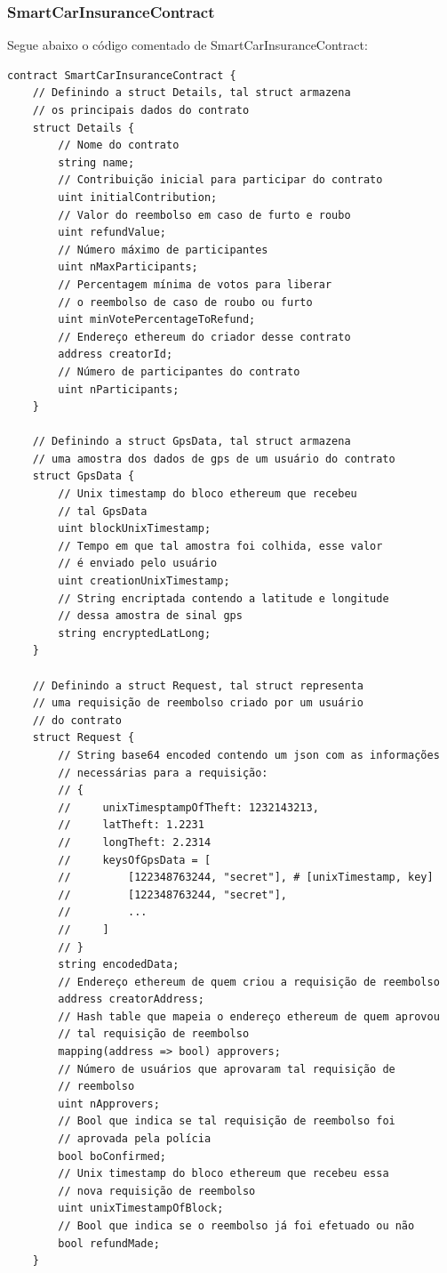 \subsubsection{SmartCarInsuranceContract}

Segue abaixo o código comentado de SmartCarInsuranceContract:

\begin{code}
\begin{verbatim}
contract SmartCarInsuranceContract {
    // Definindo a struct Details, tal struct armazena 
    // os principais dados do contrato
    struct Details {
        // Nome do contrato
        string name;
        // Contribuição inicial para participar do contrato
        uint initialContribution;
        // Valor do reembolso em caso de furto e roubo
        uint refundValue;
        // Número máximo de participantes
        uint nMaxParticipants;
        // Percentagem mínima de votos para liberar
        // o reembolso de caso de roubo ou furto
        uint minVotePercentageToRefund;
        // Endereço ethereum do criador desse contrato
        address creatorId;
        // Número de participantes do contrato
        uint nParticipants;
    }

    // Definindo a struct GpsData, tal struct armazena
    // uma amostra dos dados de gps de um usuário do contrato
    struct GpsData {
        // Unix timestamp do bloco ethereum que recebeu 
        // tal GpsData
        uint blockUnixTimestamp;
        // Tempo em que tal amostra foi colhida, esse valor
        // é enviado pelo usuário
        uint creationUnixTimestamp;
        // String encriptada contendo a latitude e longitude 
        // dessa amostra de sinal gps
        string encryptedLatLong;
    }

    // Definindo a struct Request, tal struct representa
    // uma requisição de reembolso criado por um usuário
    // do contrato
    struct Request {
        // String base64 encoded contendo um json com as informações
        // necessárias para a requisição:
        // {
        //     unixTimesptampOfTheft: 1232143213,
        //     latTheft: 1.2231
        //     longTheft: 2.2314
        //     keysOfGpsData = [
        //         [122348763244, "secret"], # [unixTimestamp, key]
        //         [122348763244, "secret"],
        //         ...
        //     ]
        // }
        string encodedData;
        // Endereço ethereum de quem criou a requisição de reembolso
        address creatorAddress;
        // Hash table que mapeia o endereço ethereum de quem aprovou
        // tal requisição de reembolso
        mapping(address => bool) approvers;
        // Número de usuários que aprovaram tal requisição de 
        // reembolso
        uint nApprovers;
        // Bool que indica se tal requisição de reembolso foi
        // aprovada pela polícia
        bool boConfirmed;
        // Unix timestamp do bloco ethereum que recebeu essa
        // nova requisição de reembolso
        uint unixTimestampOfBlock;
        // Bool que indica se o reembolso já foi efetuado ou não
        bool refundMade;
    }


\end{verbatim}
\end{code}

